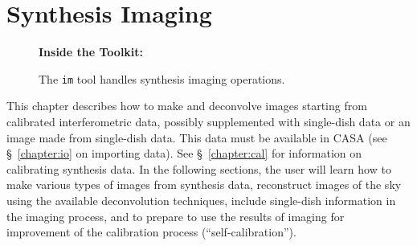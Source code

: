 

\chapter{Synthesis Imaging}
\label{chapter:im}

\begin{wrapfigure}{r}{2.5in}
  \begin{boxedminipage}{2.5in}
     \centerline{\bf Inside the Toolkit:}
     The {\tt im} tool handles synthesis imaging operations.
  \end{boxedminipage}
\end{wrapfigure}

This chapter describes how to make and deconvolve images starting from
calibrated interferometric data, possibly supplemented with
single-dish data or an image made from single-dish data.  This data
must be available in CASA (see \S~\ref{chapter:io} on importing data).
See \S~\ref{chapter:cal} for information on calibrating synthesis 
data.  In the following sections, the user will learn how to 
make various types of images from synthesis data, reconstruct images
of the sky using the available deconvolution techniques, include
single-dish information in the imaging process, and to prepare
to use the results of imaging for improvement of the calibration 
process (``self-calibration'').

